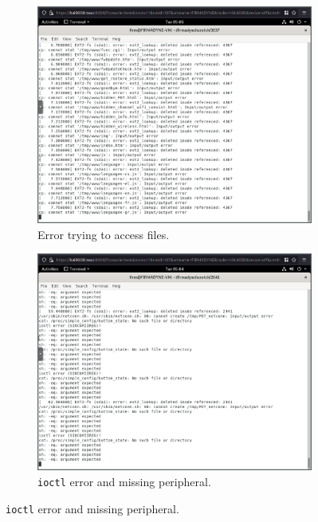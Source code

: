 \begin{figure}[H]
     \centering
     \begin{subfigure}[b]{0.45\textwidth}
         \centering
         \includegraphics[width=\textwidth]{figs/ext2-error.png}
         \caption{Error trying to access files.}
         \label{fig:}
     \end{subfigure}
     \hfill
     \begin{subfigure}[b]{0.45\textwidth}
         \centering
         \includegraphics[width=\textwidth]{figs/ioctl2-error.png}
         \caption{{\tt ioctl} error and missing peripheral.}
         \label{fig:}
     \end{subfigure}

\end{figure}
